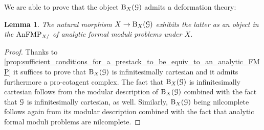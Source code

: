 \documentclass[10pt,a4paper,reqno]{amsart} %
\theoremstyle{plain}
\newtheorem{lem}[thm]{Lemma}
\theoremstyle{definition}
\theoremstyle{remark}
\numberwithin{equation}{section}
\begin{document}
We are able to prove that the object $\mathrm B_X(\mathcal G)$ admits a deformation theory:

\begin{lem} \label{lem:B_X(G)_is_formal}
    The natural morphism $X \to \mathrm B_X(\mathcal G)$ exhibits the latter as an object in the \infcat $\mathrm{AnFMP}_{X/}$ of analytic formal moduli problems
    under $X$.
\end{lem}

\begin{proof}
    Thanks to \cref{prop:sufficient_conditions_for_a_prestack_to_be_equiv_to_an_analytic_FMP} it suffices to prove that $\mathrm B_X(\mathcal G)$ is
    infinitesimally cartesian and it admits furthermore a pro-cotagent complex. The fact that $\mathrm B_X(\mathcal G)$ is infinitesimally cartesian follows from the
    modular description
    of $\mathrm B_X(\mathcal G)$ combined with the fact that $\mathcal G$ is infinitesimally cartesian, as well. Similarly, $\mathrm B_X(\mathcal G)$ being nilcomplete follows again from its
    modular description combined with the fact that analytic formal moduli problems are nilcomplete.
    

\end{proof}
\end{document}
